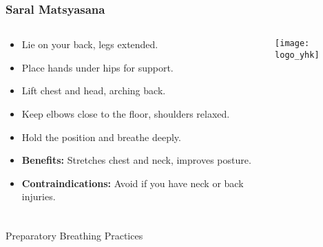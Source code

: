 \begin{frame}[fragile]\frametitle{Saral Matsyasana}
\begin{columns}
    \begin{column}[T]{0.5\linewidth}
      \begin{itemize}
        \item Lie on your back, legs extended.
        \item Place hands under hips for support.
        \item Lift chest and head, arching back.
        \item Keep elbows close to the floor, shoulders relaxed.
        \item Hold the position and breathe deeply.
        \item \textbf{Benefits:} Stretches chest and neck, improves posture.
        \item \textbf{Contraindications:} Avoid if you have neck or back injuries.
      \end{itemize}
    \end{column}
    \begin{column}[T]{0.5\linewidth}
        \begin{center}
        \texttt{[image: logo\_yhk]}
        \end{center}    
    \end{column}
  \end{columns}
\end{frame}


\begin{frame}[fragile]\frametitle{}
\begin{center}
{\Large Preparatory Breathing Practices }
\end{center}
\end{frame}

